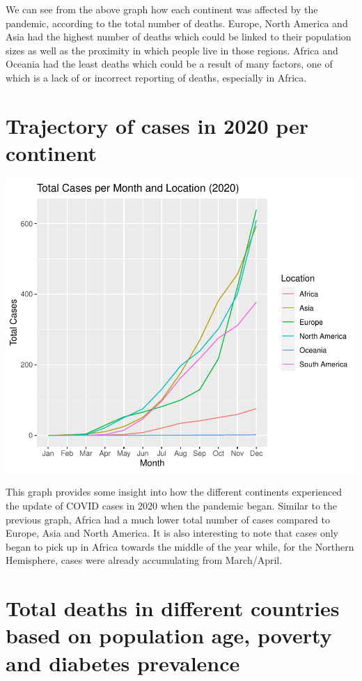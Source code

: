 \documentclass[11pt,preprint, authoryear]{elsarticle}
\numberwithin{equation}{section}
\numberwithin{figure}{section}
\numberwithin{table}{section}
\begin{document}
We can see from the above graph how each continent was affected by the
pandemic, according to the total number of deaths. Europe, North America
and Asia had the highest number of deaths which could be linked to their
population sizes as well as the proximity in which people live in those
regions. Africa and Oceania had the least deaths which could be a result
of many factors, one of which is a lack of or incorrect reporting of
deaths, especially in Africa.

\hypertarget{trajectory-of-cases-in-2020-per-continent}{%
\section{Trajectory of cases in 2020 per
continent}\label{trajectory-of-cases-in-2020-per-continent}}

\includegraphics{Question-1_files/figure-latex/unnamed-chunk-2-1.pdf}

This graph provides some insight into how the different continents
experienced the update of COVID cases in 2020 when the pandemic began.
Similar to the previous graph, Africa had a much lower total number of
cases compared to Europe, Asia and North America. It is also interesting
to note that cases only began to pick up in Africa towards the middle of
the year while, for the Northern Hemisphere, cases were already
accumulating from March/April.

\hypertarget{total-deaths-in-different-countries-based-on-population-age-poverty-and-diabetes-prevalence}{%
\section{Total deaths in different countries based on population age,
poverty and diabetes
prevalence}\label{total-deaths-in-different-countries-based-on-population-age-poverty-and-diabetes-prevalence}}
\end{document}
